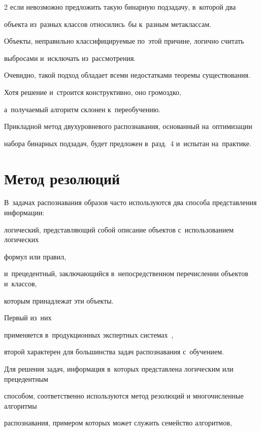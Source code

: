 \begin{multicols}{2}
если невозможно предложить такую бинарную подзадачу, в~которой два 


объекта из~разных классов относились~бы к~разным метаклассам.


Объекты, неправильно классифициру\-емые по~этой причине, логично считать 


выбросами и~исключать из~рассмотрения.





Очевидно, такой подход обладает всеми недостатками теоремы существования.


Хотя решение и~строится конструктивно, оно громоздко, 


а~получаемый алгоритм склонен к~переобучению.


Прикладной метод двухуровневого распознавания, основанный на~оптимизации 


набора бинарных подзадач, будет предложен в~разд.~4 и~испытан на~практике.





\section{Метод резолюций}





В~задачах распознавания образов часто используются два способа представления информации:


 логический, представляющий собой описание объектов с~использованием логических 


 формул или правил,


 и~прецедентный, заключающийся в~непосредственном перечислении объектов и~классов, 


 которым принадлежат эти объекты.


Первый из~них\linebreak


 применяется в~продукционных экспертных системах~\cite{Giarratano}, 


второй характерен для большинства задач распознавания с~обучением.


Для решения \mbox{задач}, информация в~которых представлена логическим или прецедентным 


способом, соответственно используются метод резолюций и многочисленные алгоритмы 


распознавания, примером которых может служить семейство алгоритмов, 



\end{multicols}

